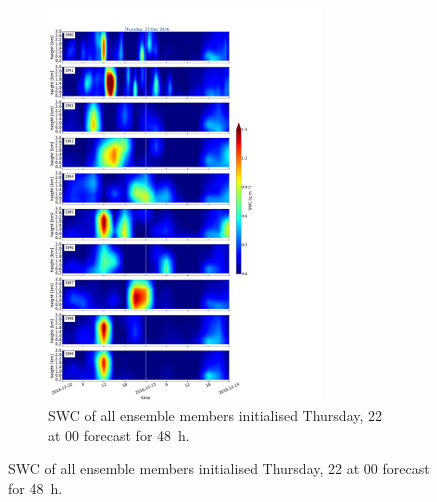 \begin{figure}[t]\ContinuedFloat
	\centering
	\begin{subfigure}[t]{\textwidth}
		\centering
		\includegraphics[trim={0cm 0cm 18.3cm 5.1cm},clip,width=0.8\textwidth]{./fig_09EM/20161222}
		\caption{SWC of all ensemble members initialised Thursday, \SI{22}{\dec} at 0\SI{0}{\UTC} forecast for \SI{48}{\hour}.}\label{fig:EM09_22}
	\end{subfigure}
\end{figure}

